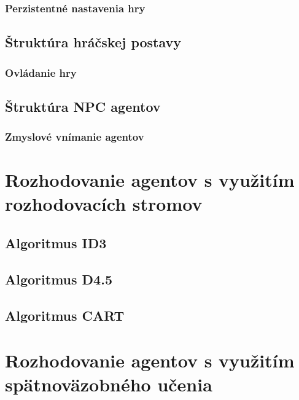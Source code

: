 \documentclass[slovak, master]{diploma}
\begin{document}
\subsection{Perzistentné nastavenia hry}
\label{sec:Settings}


\section{Štruktúra hráčskej postavy}
\label{sec:Player}
\subsection{Ovládanie hry}
\label{sec:Input}
\section{Štruktúra NPC agentov}
\label{sec:Agents}
\subsection{Zmyslové vnímanie agentov}
\label{sec:Perception}

\chapter{Rozhodovanie agentov s využitím rozhodovacích stromov}
\label{sec:ImplDecisionTrees}
\section{Algoritmus ID3}
\label{sec:ID3}
\section{Algoritmus D4.5}
\label{sec:D45}
\section{Algoritmus CART}
\label{sec:CART}

\chapter{Rozhodovanie agentov s využitím spätnoväzobného učenia}
\label{sec:ImplReinforcement learning}
\end{document}
